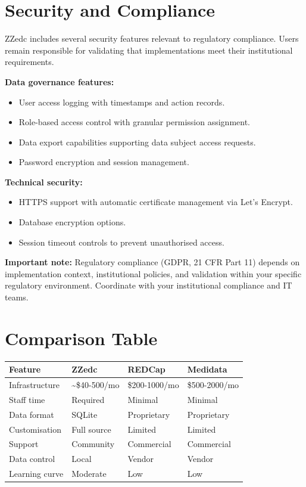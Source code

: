 \documentclass[
  letterpaper,
  DIV=11,
  numbers=noendperiod]{scrartcl}
\newcounter{none} %
\providecommand{\tightlist}{%
  \setlength{\itemsep}{0pt}\setlength{\parskip}{0pt}}
\begin{document}
\section{Security and Compliance}\label{security-and-compliance}

ZZedc includes several security features relevant to regulatory
compliance. Users remain responsible for validating that implementations
meet their institutional requirements.

\textbf{Data governance features:}

\begin{itemize}
\tightlist
\item
  User access logging with timestamps and action records.
\item
  Role-based access control with granular permission assignment.
\item
  Data export capabilities supporting data subject access requests.
\item
  Password encryption and session management.
\end{itemize}

\textbf{Technical security:}

\begin{itemize}
\tightlist
\item
  HTTPS support with automatic certificate management via Let's Encrypt.
\item
  Database encryption options.
\item
  Session timeout controls to prevent unauthorised access.
\end{itemize}

\textbf{Important note:} Regulatory compliance (GDPR, 21 CFR Part 11)
depends on implementation context, institutional policies, and
validation within your specific regulatory environment. Coordinate with
your institutional compliance and IT teams.

\section{Comparison Table}\label{comparison-table}

{\def\LTcaptype{none} %
\begin{longtable}[]{@{}llll@{}}
\toprule\noalign{}
Feature & ZZedc & REDCap & Medidata \\
\midrule\noalign{}
\endhead
\bottomrule\noalign{}
\endlastfoot
Infrastructure & \textasciitilde\$40-500/mo & \$200-1000/mo &
\$500-2000/mo \\
Staff time & Required & Minimal & Minimal \\
Data format & SQLite & Proprietary & Proprietary \\
Customisation & Full source & Limited & Limited \\
Support & Community & Commercial & Commercial \\
Data control & Local & Vendor & Vendor \\
Learning curve & Moderate & Low & Low \\
\end{longtable}
}
\end{document}
